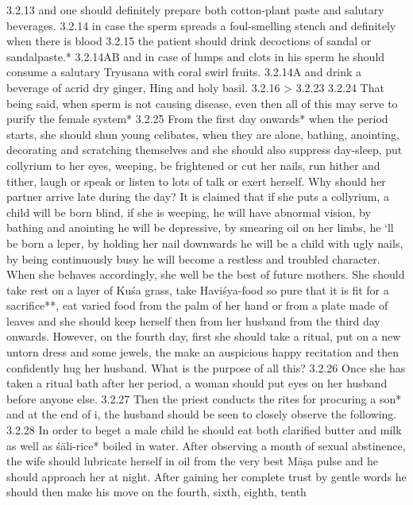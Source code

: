 \begin{translation}
  3.2.13 and one should definitely prepare both cotton-plant paste and salutary 
  beverages.
  3.2.14 in case the sperm spreads a foul-smelling stench and definitely when 
  there is blood
  3.2.15 the patient should drink decoctions of sandal or sandalpaste.*
  3.2.14AB and in case of lumps and clots in his sperm he should consume a 
  salutary Tryusana with coral swirl fruits.
  3.2.14A and drink a beverage of acrid dry ginger, Hing and holy basil.
  3.2.16 > 3.2.23 
  3.2.24 That being said, when sperm is not causing disease, even then all of this 
  may serve to purify the female system*
  3.2.25 From the first day onwards* when the period starts, she  should shun 
  young celibates, when they are alone, bathing, anointing, decorating and 
  scratching themselves and she should also suppress day-sleep, put collyrium to 
  her eyes, weeping, be frightened or cut her nails, run hither and tither, laugh or 
  speak or listen to lots of talk or exert herself. Why should her partner arrive 
  late during the day? It is claimed that if she puts a collyrium, a child will be born 
  blind, if she is weeping, he will have abnormal vision, by bathing and anointing 
  he will be depressive, by smearing oil on her limbs, he ‘ll be born a leper, by 
  holding her nail downwards he will be a child with ugly nails, by being 
  continuously busy he will become a restless and troubled character. When she 
  behaves accordingly, she well be the best of future mothers. She should take 
  rest on a layer of Kuśa  grass,  take Haviśya-food so pure that it is fit for a 
  sacrifice**, eat varied food from the palm of her hand or from a plate made of 
  leaves and she should keep herself then from her husband from the third day 
  onwards. However, on the fourth day, first she should take a ritual, put on a 
  new untorn dress and some jewels, the make an auspicious happy recitation 
  and then confidently hug her husband. What is the purpose of all this?
  3.2.26 Once she has taken a ritual bath after her period, a woman should put 
  eyes on her husband before anyone else.
  3.2.27 Then the priest conducts the rites for procuring a son* and at the end of 
  i, the husband should be seen to closely observe the following.
  3.2.28  In order to beget a male child he should eat both clarified butter and 
  milk as well as śāli-rice* boiled in water. After observing a month of sexual 
  abstinence, the wife should lubricate herself in oil from the very best Māṣa 
  pulse and he should approach her at night. After gaining her complete trust by 
  gentle words he should then make his move on the fourth, sixth, eighth, tenth 

\end{translation}
